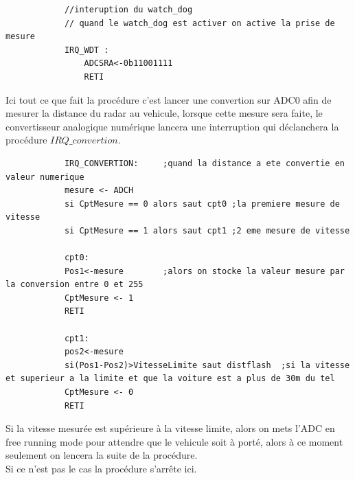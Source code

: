 \documentclass[a4paper, 12pt]{article}
\begin{document}
		\begin{lstlisting}
			//interuption du watch_dog
			// quand le watch_dog est activer on active la prise de mesure
			IRQ_WDT :
				ADCSRA<-0b11001111
				RETI
		\end{lstlisting}
		Ici tout ce que fait la procédure c'est lancer une convertion sur ADC0 afin de mesurer la distance du radar au vehicule, lorsque cette mesure sera faite, le convertisseur analogique numérique lancera une interruption qui déclanchera la procédure $IRQ\_convertion$.\\

		\begin{lstlisting}
			IRQ_CONVERTION: 	;quand la distance a ete convertie en valeur numerique
			mesure <- ADCH
			si CptMesure == 0 alors saut cpt0 ;la premiere mesure de vitesse 
			si CptMesure == 1 alors saut cpt1 ;2 eme mesure de vitesse
			
			cpt0:
			Pos1<-mesure 		;alors on stocke la valeur mesure par la conversion entre 0 et 255
			CptMesure <- 1 
			RETI
			
			cpt1:
			pos2<-mesure
			si(Pos1-Pos2)>VitesseLimite saut distflash 	;si la vitesse et superieur a la limite et que la voiture est a plus de 30m du tel
			CptMesure <- 0
			RETI
		\end{lstlisting}
		Si la vitesse mesurée est supérieure à la vitesse limite, alors on mets l'ADC en free running mode pour attendre que le vehicule soit à porté, alors à ce moment seulement on lencera la suite de la procédure.\\
		Si ce n'est pas le cas la procédure s'arrête ici.\\
		
\end{document}

